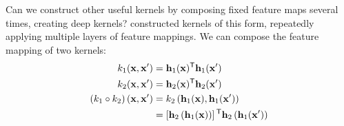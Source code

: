 Can we construct other useful kernels by composing fixed feature maps several times, creating deep kernels?  \citet{cho2012kernel} constructed kernels of this form, repeatedly applying multiple layers of feature mappings.
We can compose the feature mapping of two kernels:
\begin{align}
k_{1}({\bf{x}}, {\bf{x}}') & = {\bf{h}}_1({\bf{x}}) {^\mathsf{T}} {\bf{h}}_1({\bf{x}}') \\
k_{2}({\bf{x}}, {\bf{x}}') & = {\bf{h}}_2({\bf{x}}) {^\mathsf{T}} {\bf{h}}_2({\bf{x}}') \\
\left( k_1 \circ k_2 \right)({\bf{x}}, {\bf{x}}') & = k_2 \left({\bf{h}}_1({\bf{x}}), {\bf{h}}_1({\bf{x}}') \right) \\
& = \left[ {\bf{h}}_2 \left( {\bf{h}}_1({\bf{x}}) \right)\right] {^\ensuremath{\mathsf{T}}} {\bf{h}}_2 \left({\bf{h}}_1({\bf{x}}') \right) 
\end{align}

